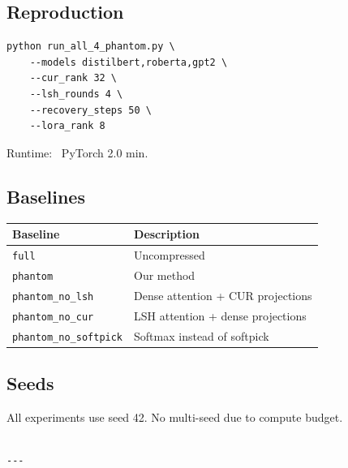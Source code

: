 \subsection{Reproduction}

\begin{lstlisting}
python run_all_4_phantom.py \
    --models distilbert,roberta,gpt2 \
    --cur_rank 32 \
    --lsh_rounds 4 \
    --recovery_steps 50 \
    --lora_rank 8
\end{lstlisting}

Runtime: ~PyTorch 2.0 min.

\subsection{Baselines}

\begin{table}[H]
\centering
\small
\begin{tabular}{ll}
\toprule
\textbf{Baseline} & \textbf{Description} \\
\midrule
\texttt{full} & Uncompressed \\
\texttt{phantom} & Our method \\
\texttt{phantom\_no\_lsh} & Dense attention + CUR projections \\
\texttt{phantom\_no\_cur} & LSH attention + dense projections \\
\texttt{phantom\_no\_softpick} & Softmax instead of softpick \\
\bottomrule
\end{tabular}
\end{table}

\subsection{Seeds}

All experiments use seed 42. No multi-seed due to compute budget.
\begin{lstlisting}

---
\end{lstlisting}